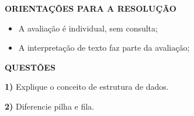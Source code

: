 \documentclass[a4paper,12pt]{article}
\begin{document}
\textbf{ORIENTAÇÕES PARA A RESOLUÇÃO}
\begin{itemize}
\item A avaliação é individual, sem consulta;
\item A interpretação de texto faz parte da avaliação;
\end{itemize}

\vspace{0.6cm}

\begin{center}
\Large\textbf{QUESTÕES}
\end{center}

\vspace{1cm}

\textbf{1)} Explique o conceito de estrutura de dados.

\vspace{3cm}

\textbf{2)} Diferencie pilha e fila.

\vspace{3cm}
\end{document}
